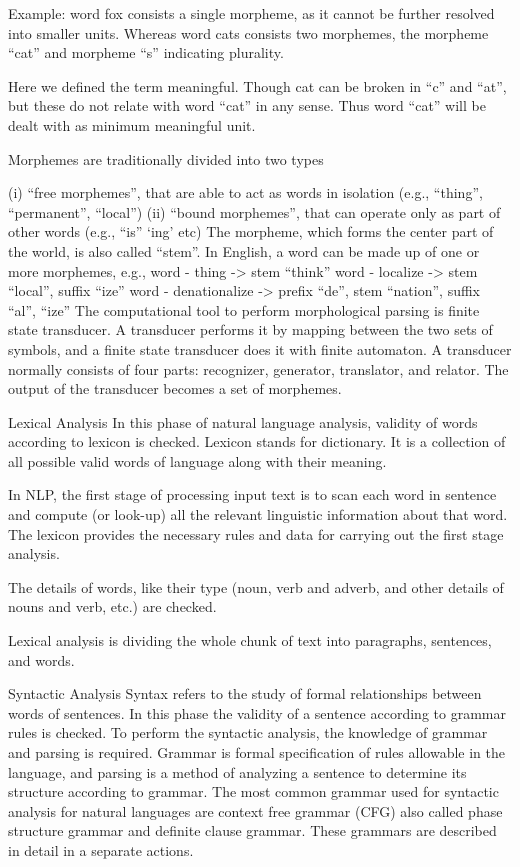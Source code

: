 Example: word fox consists a single morpheme, as it cannot be further resolved into smaller units. Whereas word cats consists two morphemes, the morpheme “cat” and morpheme “s” indicating plurality.

Here we defined the term meaningful. Though cat can be broken in “c” and “at”, but these do not relate with word “cat” in any sense. Thus word “cat” will be dealt with as minimum meaningful unit.

Morphemes are traditionally divided into two types

(i) “free morphemes”, that are able to act as words in isolation (e.g., “thing”, “permanent”, “local”)
(ii) “bound morphemes”, that can operate only as part of other words (e.g., “is” ‘ing’ etc) The morpheme, which forms the center part of the world, is also called “stem”. In English, a word can be made up of one or more morphemes, e.g.,
word - thing           -> stem “think”
word - localize        -> stem “local”, suffix “ize”
word - denationalize   -> prefix “de”, stem “nation”, suffix “al”, “ize”
The computational tool to perform morphological parsing is finite state transducer. A transducer performs it by mapping between the two sets of symbols, and a finite state transducer does it with finite automaton. A transducer normally consists of four parts: recognizer, generator, translator, and relator. The output of the transducer becomes a set of morphemes.

Lexical Analysis
In this phase of natural language analysis, validity of words according to lexicon is checked. Lexicon stands for dictionary. It is a collection of all possible valid words of language along with their meaning.

In NLP, the first stage of processing input text is to scan each word in sentence and compute (or look-up) all the relevant linguistic information about that word. The lexicon provides the necessary rules and data for carrying out the first stage analysis.

The details of words, like their type (noun, verb and adverb, and other details of nouns and verb, etc.) are checked.



Lexical analysis is dividing the whole chunk of text into paragraphs, sentences, and words.

Syntactic Analysis
Syntax refers to the study of formal relationships between words of sentences. In this phase the validity of a sentence according to grammar rules is checked. To perform the syntactic analysis, the knowledge of grammar and parsing is required. Grammar is formal specification of rules allowable in the language, and parsing is a method of analyzing a sentence to determine its structure according to grammar. The most common grammar used for syntactic analysis for natural languages are context free grammar (CFG) also called phase structure grammar and definite clause grammar. These grammars are described in detail in a separate actions.




